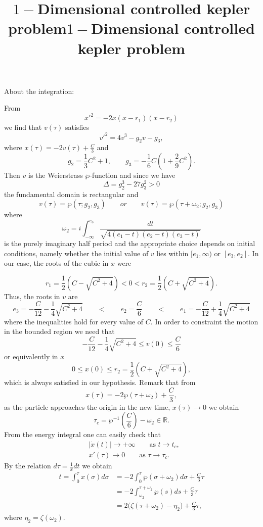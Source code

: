 \documentclass{article}
\title{$1-$Dimensional controlled kepler problem}
\begin{document}
\title{$1-$Dimensional controlled kepler problem}


\section{}
About the integration:

From
$$
x'^2 = -2x(x-r_1)(x-r_2)
$$
we find that $v(\tau)$ satisfies 
$$
v'^2 = 4v^3 - g_2 v - g_3,
$$
where  $x(\tau) = -2v(\tau) + \frac{C}{3}$ and
 $$
g_2 = \frac{1}{3}C^2 +1, \qquad  g_3 =- \frac{1}{6}C(1+\frac{2}{9}C^2).
 $$
 Then $v$ is the Weierstrass $\wp$-function and since we have
 $$
\Delta = g_2^3 - 27 g_3^2 > 0
 $$
the fundamental domain is rectangular and
 $$
v(\tau) = \wp(\tau; g_2,g_3) \qquad or \qquad v(\tau) = \wp(\tau+\omega_2; g_2,g_3) 
 $$
where 
\[
\omega_2 = i\int_{-\infty}^{e_3}\frac{dt}{\sqrt{4(e_1-t)(e_2-t)(e_3-t)}}
\]
is the purely imaginary half period and the appropriate choice depends on initial conditions, namely whether the initial value of $v$ lies within $[e_1, \infty)$ or $[e_3, e_2]$.
In our case, the roots of the cubic in $x$ were

 $$
r_1 = \frac{1}{2}(C-\sqrt{C^2+4}) <  0 < r_2 = \frac{1}{2}(C+\sqrt{C^2+4}).
 $$
Thus, the roots in $v$ are
 $$
e_3 = -\frac{C}{12} - \frac{1}{4}\sqrt{C^2+4} \qquad < \qquad e_2 =  \frac{C}{6} \qquad < \qquad e_1 =-\frac{C}{12} + \frac{1}{4}\sqrt{C^2+4}
 $$
where the inequalities hold for every value of $C$.
In order to constraint the motion in the bounded region we need that
 $$
-\frac{C}{12} - \frac{1}{4}\sqrt{C^2+4}  \leq v(0) \leq  \frac{C}{6} 
 $$
or equivalently in $x$
 $$
0 \leq x(0) \leq  r_2 = \frac{1}{2}(C+\sqrt{C^2+4}),
$$
which is always satisfied in our hypothesis. Remark that from
\[
x(\tau) = -2\wp(\tau+\omega_2)+\frac{C}{3},
\]
as the particle approaches the origin in the new time, $x(\tau) \to 0$ we obtain
\[
\tau_c = \wp^{-1}(\frac{C}{6})-\omega_2 \in \mathds{R}.
\]
From the energy integral one can easily check that
\begin{equation*}
\begin{split}
&|\dot x(t)| \longrightarrow +\infty \qquad \text{as } t \to t_c, \\
& x'(\tau) \longrightarrow 0 \qquad \text{as } \tau  \to \tau_c.
 \end{split}
\end{equation*}
By the relation $d\tau = \frac{1}{x} dt$ we obtain
\begin{equation*}
    \begin{split}
        t = \int_{0}^{\tau} x(\sigma) d\sigma 
         &= -2\int_{0}^{\tau} \wp(\sigma + \omega_2) d\sigma + \frac{C}{3}\tau \\
         &= -2\int_{\omega_2}^{\tau+\omega_2} \wp(s)ds + \frac{C}{3}\tau \\
         &= 2\big(\zeta(\tau + \omega_2) - \eta_2\big) + \frac{C}{3}\tau,
    \end{split}
\end{equation*}
where $\eta_2 = \zeta(\omega_2)$.
 
\end{document}

